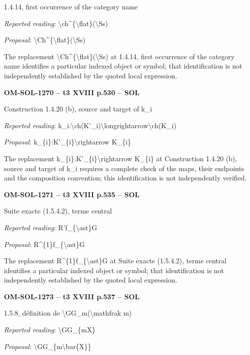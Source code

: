 1.4.14, first occurrence of the category name\par
\emph{Reported reading}: \textbackslash{}ch\textasciicircum{}\{\textbackslash{}flat\}(\textbackslash{}Ss)\par
\emph{Proposal}: \textbackslash{}Ch\textasciicircum{}\{\textbackslash{}flat\}(\textbackslash{}Ss)\par
The replacement \textbackslash{}Ch\textasciicircum{}\{\textbackslash{}flat\}(\textbackslash{}Ss) at 1.4.14, first occurrence of the category name identifies a particular indexed object or symbol; that identification is not independently established by the quoted local expression.\par
\par\noindent\textbf{OM-SOL-1270 -- t3 XVIII p.530 -- SOL}\par
Construction 1.4.20 (b), source and target of k\_i\par
\emph{Reported reading}: k\_i:\textbackslash{}ch(K'\_i)\textbackslash{}longrightarrow\textbackslash{}ch(K\_i)\par
\emph{Proposal}: k\_\{i\}:K'\_\{i\}\textbackslash{}rightarrow K\_\{i\}\par
The replacement k\_\{i\}:K'\_\{i\}\textbackslash{}rightarrow K\_\{i\} at Construction 1.4.20 (b), source and target of k\_i requires a complete check of the maps, their endpoints and the composition convention; this identification is not independently verified.\par
\par\noindent\textbf{OM-SOL-1271 -- t3 XVIII p.535 -- SOL}\par
Suite exacte (1.5.4.2), terme central\par
\emph{Reported reading}: R'f\_\{\textbackslash{}ast\}G\par
\emph{Proposal}: R\textasciicircum{}\{1\}f\_\{\textbackslash{}ast\}G\par
The replacement R\textasciicircum{}\{1\}f\_\{\textbackslash{}ast\}G at Suite exacte (1.5.4.2), terme central identifies a particular indexed object or symbol; that identification is not independently established by the quoted local expression.\par
\par\noindent\textbf{OM-SOL-1273 -- t3 XVIII p.537 -- SOL}\par
1.5.8, définition de \textbackslash{}GG\_m(\textbackslash{}mathfrak m)\par
\emph{Reported reading}: \textbackslash{}GG\_\{mX\}\par
\emph{Proposal}: \textbackslash{}GG\_\{m\textbackslash{}bar\{X\}\}\par

